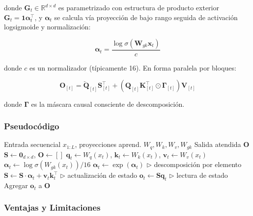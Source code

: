 \documentclass[11pt,a4paper]{article}
\begin{document}
donde $\mathbf{G}_t \in \mathbb{R}^{d \times d}$ es parametrizado con estructura de producto exterior $\mathbf{G}_t = \mathbf{1} \boldsymbol{\alpha}_t^\top$, y $\boldsymbol{\alpha}_t$ se calcula vía proyección de bajo rango seguida de activación logsigmoide y normalización:

\begin{equation}
\boldsymbol{\alpha}_t = \frac{\log \sigma(\mathbf{W}_{gk} \mathbf{x}_t)}{c}
\end{equation}

donde $c$ es un normalizador (típicamente 16). En forma paralela por bloques:

\begin{equation}
\mathbf{O}_{[t]} = \overleftarrow{\mathbf{Q}}_{[t]} \mathbf{S}_{[t]}^\top + \left(\mathbf{Q}_{[t]} \mathbf{K}_{[t]}^\top \odot \mathbf{\Gamma}_{[t]}\right) \mathbf{V}_{[t]}
\end{equation}

donde $\mathbf{\Gamma}$ es la máscara causal consciente de descomposición.

\subsubsection{Pseudocódigo}

\begin{algorithm}
\caption{Atención Lineal con Compuerta (GLA) - Forma Recurrente}
\begin{algorithmic}[1]
\Require Entrada secuencial $x_{1:L}$, proyecciones aprend. $W_q, W_k, W_v, W_{gk}$
\Ensure Salida atendida $\mathbf{O}$
\State $\mathbf{S} \gets \mathbf{0}_{d \times d}$, $\mathbf{O} \gets []$
    \State $\mathbf{q}_t \gets W_q(x_t)$, $\mathbf{k}_t \gets W_k(x_t)$, $\mathbf{v}_t \gets W_v(x_t)$
    \State $\boldsymbol{\alpha}_t \gets \log \sigma(W_{gk}(x_t)) / 16$
    \State $\boldsymbol{\alpha}_t \gets \exp(\boldsymbol{\alpha}_t)$ \quad $\triangleright$ descomposición por elemento
    \State $\mathbf{S} \gets \mathbf{S} \cdot \boldsymbol{\alpha}_t + \mathbf{v}_t \mathbf{k}_t^\top$ \quad $\triangleright$ actualización de estado
    \State $\mathbf{o}_t \gets \mathbf{S} \mathbf{q}_t$ \quad $\triangleright$ lectura de estado
    \State Agregar $\mathbf{o}_t$ a $\mathbf{O}$
\EndFor
\end{algorithmic}
\end{algorithm}

\subsubsection{Ventajas y Limitaciones}
\end{document}
